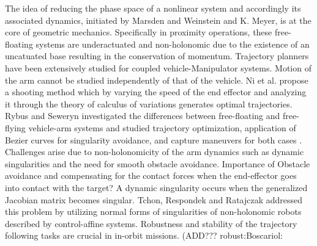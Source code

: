\documentclass[lettersize,journal]{IEEEtran}
\begin{document}
The idea of reducing the phase space of a nonlinear system and accordingly its associated dynamics, initiated by Marsden and Weinstein\cite{MARSDEN1974} and K. Meyer\cite{meyer1973symmetries}, is at the core of geometric mechanics. Specifically in proximity operations, these free-floating systems are underactuated and non-holonomic due to the existence of an uncatuated base resulting in the conservation of momentum. 
Trajectory planners have been extensively studied for coupled vehicle-Manipulator systems\cite{Huang2006,Chamitoff2014,King}. Motion of the arm cannot be studied independently of that of the vehicle. Ni et al. propose a shooting method which by varying the speed of the end effector and analyzing it through the theory of calculus of variations generates optimal trajectories\cite{ni2017trajectory}{}.
Rybus and Seweryn investigated the differences between free-floating and free-flying vehicle-arm systems\cite{rybus2018manipulator} and studied trajectory optimization\cite{seweryn2008optimization}, application of Bezier curves for singularity avoidance\cite{Rybus2016}, and capture maneuvers for both cases \cite{rybus2018manipulator}. 
Challenges arise due to non-holonomicity of the arm dynamics such as dynamic singularities\cite{Papadopoulos,Respondek2018} and the need for smooth obstacle avoidance\cite{Papadopoulos2005polynomial,rybus2018obstacle}{}. Importance of Obstacle avoidance and compensating for the contact forces when the end-effector goes into contact with the target? %
A dynamic singularity occurs when the generalized Jacobian matrix\cite{Umetani1989} becomes singular. Tchon, Respondek and Ratajczak addressed this problem by utilizing normal forms of singularities of non-holonomic robots described by control-affine systems\cite{Respondek2018}{}. Robustness and stability of the trajectory following tasks are crucial in in-orbit missions\cite{King,rybus2016trajectory,seddaoui2017optimised}. (ADD??? robust:Boscariol:\cite{boscariol2016optimal}
\end{document}
